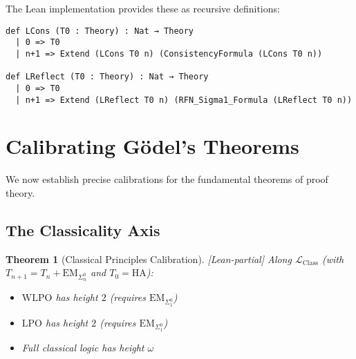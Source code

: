 \documentclass[11pt]{article}
\newtheorem{theorem}{Theorem}[section]
\newcommand{\HA}{\mathrm{HA}}
\newcommand{\LClass}{\mathcal{L}_{\mathrm{Class}}}
\newcommand{\EM}{\mathrm{EM}}
\newcommand{\LPO}{\mathrm{LPO}}
\newcommand{\WLPO}{\mathrm{WLPO}}
\newcommand{\leanpartial}{\textsf{\textcolor{violet!70!black}{[Lean-partial]}}}
\begin{document}
The Lean implementation provides these as recursive definitions:
\begin{lstlisting}[language=Lean]
def LCons (T0 : Theory) : Nat → Theory
  | 0 => T0
  | n+1 => Extend (LCons T0 n) (ConsistencyFormula (LCons T0 n))

def LReflect (T0 : Theory) : Nat → Theory  
  | 0 => T0
  | n+1 => Extend (LReflect T0 n) (RFN_Sigma1_Formula (LReflect T0 n))
\end{lstlisting}

\section{Calibrating Gödel's Theorems}

We now establish precise calibrations for the fundamental theorems of proof theory.

\subsection{The Classicality Axis}

\begin{theorem}[Classical Principles Calibration] \leanpartial
Along $\LClass$ (with $T_{n+1}=T_n+\EM_{\Sigma^0_n}$ and $T_0=\HA$):
\begin{itemize}
\item $\WLPO$ has height $2$ (requires $\EM_{\Sigma^0_1}$)
\item $\LPO$ has height $2$ (requires $\EM_{\Sigma^0_1}$)
\item Full classical logic has height $\omega$
\end{itemize}
\end{theorem}
\end{document}
